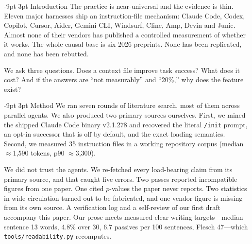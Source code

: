 \documentclass[10pt,twocolumn,a4paper]{article}
\makeatletter
\renewcommand\section{\@startsection{section}{1}{\z@}%
  {-9pt \@plus -2pt \@minus -1pt}{3pt}%
  {\normalfont\large\bfseries\color{acc}}}
\makeatother
\begin{document}
\section{Introduction}
The practice is near-universal and the evidence is thin. Eleven major harnesses
ship an instruction-file mechanism: Claude Code, Codex, Copilot, Cursor, Aider,
Gemini CLI, Windsurf, Cline, Amp, Devin and Junie. Almost none of their vendors
has published a controlled measurement of whether it works. The whole causal base
is six 2026 preprints. None has been replicated, and none has been rebutted.

We ask three questions. Does a context file improve task success? What does it
cost? And if the answers are ``not measurably'' and ``20\%,'' why does the feature
exist?

\section{Method}
We ran seven rounds of literature search, most of them across parallel
agents. We also produced two primary sources ourselves. First, we mined the
shipped Claude Code binary v2.1.278 and recovered the literal \texttt{/init}
prompt, an opt-in successor that is off by default, and the exact loading
semantics. Second, we measured 35 instruction files in a working repository
corpus (median $\approx$1{,}590 tokens, p90 $\approx$3{,}300).

We did not trust the agents. We re-fetched every load-bearing claim from its
primary source, and that caught five errors. Two passes reported incompatible
figures from one paper. One cited $p$-values the paper never reports. Two
statistics in wide circulation turned out to be fabricated, and one vendor figure
is missing from its own source. A verification log and a self-review of our first
draft accompany this paper. Our prose meets measured clear-writing targets---median sentence
13 words, 4.8\% over 30, 6.7 passives per 100 sentences, Flesch
47---which \texttt{tools/readability.py} recomputes.
\end{document}
